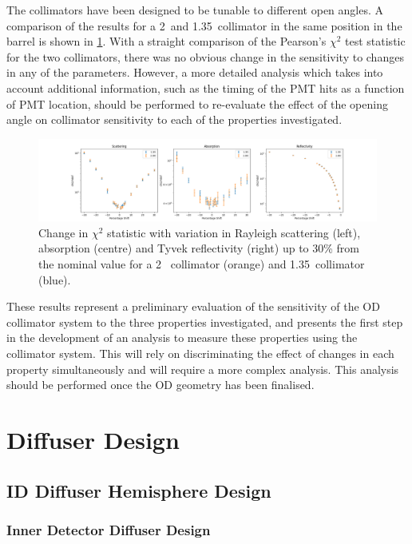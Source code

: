 \documentclass[a4paper,11pt]{article}
\begin{document}
The collimators have been designed to be tunable to different open angles. A comparison of the results for a 2\textdegree~and 1.35\textdegree~collimator in the same position in the barrel is shown in \cref{fig:barrelCompareCollAngles}. With a straight comparison of the Pearson's $\chi^2$ test statistic for the two collimators, there was no obvious change in the sensitivity to changes in any of the parameters. However, a more detailed analysis which takes into account additional information, such as the timing of the PMT hits as a function of PMT location, should be performed to re-evaluate the effect of the opening angle on collimator sensitivity to each of the properties investigated.

\begin{figure}[ht!]
    \centering
    \includegraphics[width=\textwidth]{params_comparison_plots_1.35_2.00.png}
    \caption{Change in $\chi^2$ statistic with variation in Rayleigh scattering (left), absorption (centre) and Tyvek reflectivity (right) up to 30\% from the nominal value for a 2\textdegree~ collimator (orange) and 1.35\textdegree~collimator (blue).}
    \label{fig:barrelCompareCollAngles}
\end{figure}

These results represent a preliminary evaluation of the sensitivity of the OD collimator system to the three properties investigated, and presents the first step in the development of an analysis to measure these properties using the collimator system. This will rely on discriminating the effect of changes in each property simultaneously and will require a more complex analysis. This analysis should be performed once the OD geometry has been finalised.

\section{Diffuser Design}\label{sec:diffuser}
\subsection{ID Diffuser Hemisphere Design}
\subsubsection{Inner Detector Diffuser Design}
\end{document}
